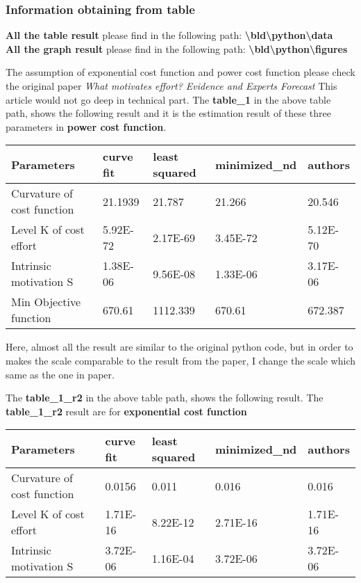 \documentclass[11pt
]{article}
\begin{document}
\hypertarget{information-obtaining-from-table}{%
\subsubsection{Information obtaining from
table}\label{information-obtaining-from-table}}

\textbf{All the table result} please find in the following path:
\textbf{\textbackslash bld\textbackslash python\textbackslash data}\\
\textbf{All the graph result} please find in the following path:
\textbf{\textbackslash bld\textbackslash python\textbackslash figures}

The assumption of exponential cost function and power cost function
please check the original paper \emph{What motivates effort? Evidence
and Experts Forecast} This article would not go deep in technical part.
The \textbf{table\_1} in the above table path, shows the following
result and it is the estimation result of these three parameters in
\textbf{power cost function}.

\begin{longtable}[]{@{}lllll@{}}
\toprule()
Parameters & curve fit & least squared & minimized\_nd & authors \\
\midrule()
\endhead
Curvature of cost function & 21.1939 & 21.787 & 21.266 & 20.546 \\
Level K of cost effort & 5.92E-72 & 2.17E-69 & 3.45E-72 & 5.12E-70 \\
Intrinsic motivation S & 1.38E-06 & 9.56E-08 & 1.33E-06 & 3.17E-06 \\
Min Objective function & 670.61 & 1112.339 & 670.61 & 672.387 \\
\bottomrule()
\end{longtable}

Here, almost all the result are similar to the original python code, but
in order to makes the scale comparable to the result from the paper, I
change the scale which same as the one in paper.

The \textbf{table\_1\_r2} in the above table path, shows the following
result. The \textbf{table\_1\_r2} result are for \textbf{exponential
cost function}

\begin{longtable}[]{@{}lllll@{}}
\toprule()
Parameters & curve fit & least squared & minimized\_nd & authors \\
\midrule()
\endhead
Curvature of cost function & 0.0156 & 0.011 & 0.016 & 0.016 \\
Level K of cost effort & 1.71E-16 & 8.22E-12 & 2.71E-16 & 1.71E-16 \\
Intrinsic motivation S & 3.72E-06 & 1.16E-04 & 3.72E-06 & 3.72E-06 \\
\bottomrule()
\end{longtable}
\end{document}

